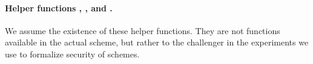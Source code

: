 \paragraph{Helper functions \SimSetup, \ExtractIssue, and \ExtractSign.}
We assume the existence of these helper functions. They are not functions
available in the actual scheme, but rather to the challenger in the experiments
we use to formalize security of \UAS schemes.

